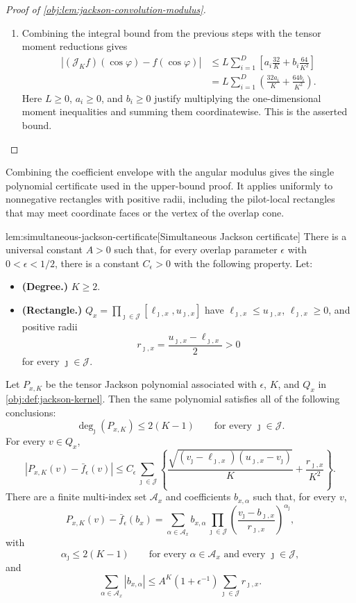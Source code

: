 \documentclass[11pt]{article}
\begin{document}
\begin{proof}[Proof of \cref{obj:lem:jackson-convolution-modulus}]
\begin{enumerate}
\item Combining the integral bound from the previous steps with the tensor moment reductions gives
\[
\begin{aligned}
\left|(\mathcal J_K f)(\cos\varphi)-f(\cos\varphi)\right|
&\le
L\sum_{i=1}^D
\left[
a_i\frac{32}{K}
+
b_i\frac{64}{K^2}
\right]  \\
&=
L\sum_{i=1}^D
\left(\frac{32a_i}{K}+\frac{64b_i}{K^2}\right).
\end{aligned}
\]
Here \(L\ge0\), \(a_i\ge0\), and \(b_i\ge0\) justify multiplying the one-dimensional moment inequalities and summing them coordinatewise. This is the asserted bound. %
\end{enumerate}
\end{proof}

Combining the coefficient envelope with the angular modulus gives the single polynomial certificate used in the upper-bound proof. It applies uniformly to nonnegative rectangles with positive radii, including the pilot-local rectangles that may meet coordinate faces or the vertex of the overlap cone.

\begin{lemmav}{lem:simultaneous-jackson-certificate}[Simultaneous Jackson certificate]
There is a universal constant \(A>0\) such that, for every overlap parameter \(\epsilon\) with \(0<\epsilon<1/2\), there is a constant \(C_\epsilon>0\) with the following property. Let:
\begin{itemize}
\item \textbf{(Degree.)} \(K\ge 2\).
\item \textbf{(Rectangle.)} \(Q_x=\prod_{\jmath\in\mathcal J}[\ell_{\jmath,x},u_{\jmath,x}]\) have \(\ell_{\jmath,x}\le u_{\jmath,x}\), \(\ell_{\jmath,x}\ge 0\), and positive radii
\[
r_{\jmath,x}=\frac{u_{\jmath,x}-\ell_{\jmath,x}}{2}>0
\]
for every \(\jmath\in\mathcal J\).
\end{itemize}
Let \(P_{x,K}\) be the tensor Jackson polynomial associated with \(\epsilon\), \(K\), and \(Q_x\) in \cref{obj:def:jackson-kernel}. Then the same polynomial satisfies all of the following conclusions:
\[
\deg_{\jmath}(P_{x,K})\le 2(K-1)
\qquad\text{for every }\jmath\in\mathcal J .
\]
For every \(v\in Q_x\),
\[
\left|P_{x,K}(v)-\bar f_\epsilon(v)\right|
\le
C_\epsilon
\sum_{\jmath\in\mathcal J}
\left\{
\frac{\sqrt{(v_{\jmath}-\ell_{\jmath,x})(u_{\jmath,x}-v_{\jmath})}}{K}
+
\frac{r_{\jmath,x}}{K^2}
\right\}.
\]
There are a finite multi-index set \(\mathcal A_x\) and coefficients \(b_{x,\alpha}\) such that, for every \(v\),
\[
P_{x,K}(v)-\bar f_\epsilon(b_x)
=
\sum_{\alpha\in\mathcal A_x}
b_{x,\alpha}
\prod_{\jmath\in\mathcal J}
\left(\frac{v_{\jmath}-b_{\jmath,x}}{r_{\jmath,x}}\right)^{\alpha_{\jmath}},
\]
with
\[
\alpha_{\jmath}\le 2(K-1)
\qquad\text{for every }\alpha\in\mathcal A_x\text{ and every }\jmath\in\mathcal J,
\]
and
\[
\sum_{\alpha\in\mathcal A_x}|b_{x,\alpha}|
\le
A^K(1+\epsilon^{-1})
\sum_{\jmath\in\mathcal J} r_{\jmath,x}.
\]
\end{lemmav}
\end{document}

